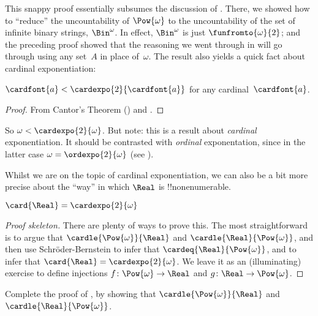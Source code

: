 \documentclass[../../../include/open-logic-section]{subfiles}
\begin{document}
This snappy proof essentially subsumes the discussion of
. There, we showed how to ``reduce'' the
uncountability of $\Pow{\omega}$ to the uncountability of the set of
infinite binary strings, $\Bin^\omega$. In effect, $\Bin^{\omega}$ is
just $\funfromto{\omega}{2}$; and the preceding proof showed that the
reasoning we went through in  will go
through using any set~$A$ in place of~$\omega$. The result also yields
a quick fact about cardinal exponentiation:

\begin{cor}
$\cardfont{a} < \cardexpo{2}{\cardfont{a}}$ for any cardinal~$\cardfont{a}$.
\end{cor}

\begin{proof}
From Cantor's Theorem () and
.
\end{proof}
\noindent
So $\omega < \cardexpo{2}{\omega}$. But note: this is a result about
\emph{cardinal} exponentiation. It should be contrasted with
\emph{ordinal} exponentation, since in the latter case $\omega =
\ordexpo{2}{\omega}$ (see ).

Whilst we are on the topic of cardinal exponentiation, we can also be
a bit more precise about the ``way'' in which $\Real$ is
!!{nonenumerable}.

\begin{thm}
$\card{\Real} = \cardexpo{2}{\omega}$
\end{thm}

\begin{proof}[Proof skeleton]
There are plenty of ways to prove this. The most straightforward is to
argue that $\cardle{\Pow{\omega}}{\Real}$ and
$\cardle{\Real}{\Pow{\omega}}$, and then use Schr\"oder-Bernstein to
infer that $\cardeq{\Real}{\Pow{\omega}}$, and
 to infer
that $\card{\Real} = \cardexpo{2}{\omega}$. We leave it as an
(illuminating) exercise to define injections $f \colon
\Pow{\omega} \to \Real$ and $g \colon \Real \to \Pow{\omega}$.
\end{proof}

\begin{prob}
Complete the proof of
, by
showing that $\cardle{\Pow{\omega}}{\Real}$ and
$\cardle{\Real}{\Pow{\omega}}$.
\end{prob}
\end{document}
